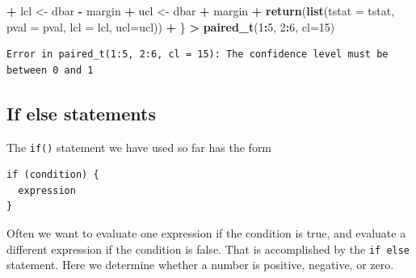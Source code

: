 \documentclass[
]{krantz}
\makeatletter
\newenvironment{Shaded}{\begin{snugshade}}{\end{snugshade}}
\newcommand{\DataTypeTok}[1]{\textcolor[rgb]{0.27,0.27,0.27}{#1}}
\newcommand{\DecValTok}[1]{\textcolor[rgb]{0.06,0.06,0.06}{#1}}
\newcommand{\KeywordTok}[1]{\textcolor[rgb]{0.27,0.27,0.27}{\textbf{#1}}}
\newcommand{\NormalTok}[1]{#1}
\newcommand{\OperatorTok}[1]{\textcolor[rgb]{0.43,0.43,0.43}{\textbf{#1}}}
\newcommand{\StringTok}[1]{\textcolor[rgb]{0.5,0.5,0.5}{#1}}
\newenvironment{kframe}{%
\medskip{}
\setlength{\fboxsep}{.8em}
 \def\at@end@of@kframe{}%
 \ifinner\ifhmode%
  \def\at@end@of@kframe{\end{minipage}}%
  \begin{minipage}{\columnwidth}%
 \fi\fi%
 \def\FrameCommand##1{\hskip\@totalleftmargin \hskip-\fboxsep
 \colorbox{shadecolor}{##1}\hskip-\fboxsep
     \hskip-\linewidth \hskip-\@totalleftmargin \hskip\columnwidth}%
 \MakeFramed {\advance\hsize-\width
   \@totalleftmargin\z@ \linewidth\hsize
   \@setminipage}}%
 {\par\unskip\endMakeFramed%
 \at@end@of@kframe}
\renewenvironment{Shaded}{\begin{kframe}}{\end{kframe}}
\makeatother
\begin{document}
\begin{Shaded}
\begin{Highlighting}[]
\OperatorTok{+}\StringTok{     }\NormalTok{lcl \textless{}{-}}\StringTok{ }\NormalTok{dbar }\OperatorTok{{-}}\StringTok{ }\NormalTok{margin}
\OperatorTok{+}\StringTok{     }\NormalTok{ucl \textless{}{-}}\StringTok{ }\NormalTok{dbar }\OperatorTok{+}\StringTok{ }\NormalTok{margin}
\OperatorTok{+}\StringTok{     }\KeywordTok{return}\NormalTok{(}\KeywordTok{list}\NormalTok{(}\DataTypeTok{tstat =}\NormalTok{ tstat, }\DataTypeTok{pval =}\NormalTok{ pval, }\DataTypeTok{lcl =}\NormalTok{ lcl, }\DataTypeTok{ucl=}\NormalTok{ucl))}
\OperatorTok{+}\StringTok{ }\NormalTok{\}}
\OperatorTok{\textgreater{}}\StringTok{ }\KeywordTok{paired\_t}\NormalTok{(}\DecValTok{1}\OperatorTok{:}\DecValTok{5}\NormalTok{, }\DecValTok{2}\OperatorTok{:}\DecValTok{6}\NormalTok{, }\DataTypeTok{cl=}\DecValTok{15}\NormalTok{)}
\end{Highlighting}
\end{Shaded}

\begin{verbatim}
Error in paired_t(1:5, 2:6, cl = 15): The confidence level must be between 0 and 1
\end{verbatim}

\hypertarget{if-else-statements}{%
\subsection{If else statements}\label{if-else-statements}}

The \texttt{if()} statement we have used so far has the form

\begin{verbatim}
if (condition) {
  expression
}
\end{verbatim}

Often we want to evaluate one expression if the condition is true, and evaluate a different expression if the condition is false. That is accomplished by the \texttt{if\ else} statement. Here we determine whether a number is positive, negative, or zero.
\end{document}

